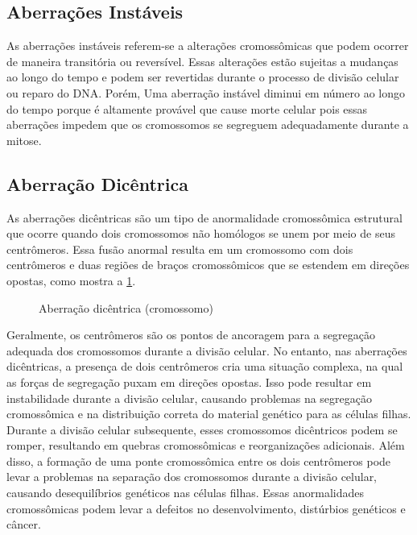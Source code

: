 \documentclass[11pt,a4paper]{article}
\begin{document}
\subsection{Aberrações Instáveis}

	As aberrações instáveis referem-se a alterações cromossômicas que podem ocorrer de maneira transitória ou reversível. Essas alterações estão sujeitas a mudanças ao longo do tempo e podem ser revertidas durante o processo de divisão celular ou reparo do DNA. Porém, Uma aberração instável diminui em número ao longo do tempo porque é altamente provável que cause morte celular pois essas aberrações impedem que os cromossomos se segreguem adequadamente durante a mitose.

\subsection*{Aberração Dicêntrica}


	As aberrações dicêntricas são um tipo de anormalidade cromossômica estrutural que ocorre quando dois cromossomos não homólogos se unem por meio de seus centrômeros. Essa fusão anormal resulta em um cromossomo com dois centrômeros e duas regiões de braços cromossômicos que se estendem em direções opostas, como mostra a \ref{fig:aberracaoDicentrica}. 

	\begin{figure}
		\caption{Aberração dicêntrica (cromossomo)}
		\label{fig:aberracaoDicentrica}
	\end{figure}
	
	Geralmente, os centrômeros são os pontos de ancoragem para a segregação adequada dos cromossomos durante a divisão celular. No entanto, nas aberrações dicêntricas, a presença de dois centrômeros cria uma situação complexa, na qual as forças de segregação puxam em direções opostas. Isso pode resultar em instabilidade durante a divisão celular, causando problemas na segregação cromossômica e na distribuição correta do material genético para as células filhas. Durante a divisão celular subsequente, esses cromossomos dicêntricos podem se romper, resultando em quebras cromossômicas e reorganizações adicionais. Além disso, a formação de uma ponte cromossômica entre os dois centrômeros pode levar a problemas na separação dos cromossomos durante a divisão celular, causando desequilíbrios genéticos nas células filhas. Essas anormalidades cromossômicas podem levar a defeitos no desenvolvimento, distúrbios genéticos e câncer.
\end{document}
